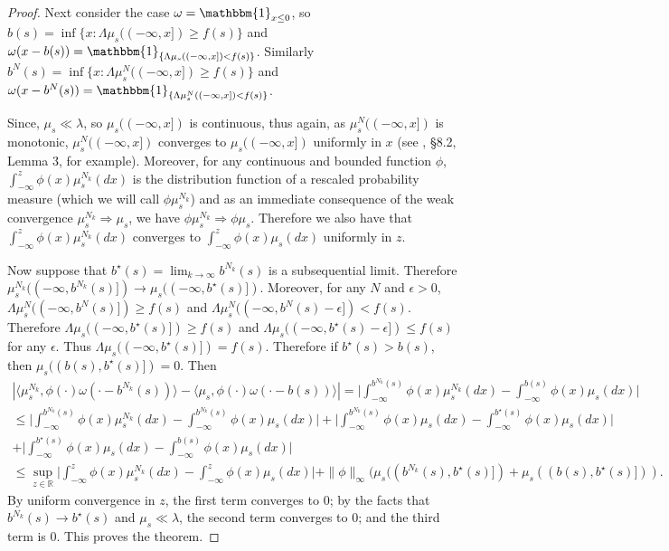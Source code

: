 \documentclass{article}
\newcommand{\B}[1]{\mathbb{#1}}
\newcommand{\is}{\mathbbm{1}}
\begin{document}
\begin{proof}
    Next consider the case $\omega=\is_{x\leq 0}$, so $b(s)=\inf\{x:\Lambda\mu_s((-\infty,x])\geq f(s)\}$ and $\omega(x-b(s))=\is_{\{\Lambda\mu_s((-\infty,x])<f(s)\}}$. Similarly $b^N(s)=\inf\{x:\Lambda\mu_s^N((-\infty,x])\geq f(s)\}$ and $\omega(x-b^N(s))=\is_{\{\Lambda\mu_s^N((-\infty,x])<f(s)\}}$. 
    
    Since, $\mu_s\ll\lambda$, so $\mu_s((-\infty,x])$ is continuous, thus again, as $\mu_s^N((-\infty,x])$ is monotonic, $\mu^N_s((-\infty,x])$ converges to $\mu_s((-\infty,x])$ uniformly in $x$ (see \cite{chowTeicher}, \S 8.2, Lemma 3, for example). Moreover, for any continuous and bounded function $\phi$, $\int_{-\infty}^z \phi(x)\mu_s^{N_k}(dx)$ is the distribution function of a rescaled probability measure (which we will call $\phi\mu_s^{N_k}$) and as an immediate consequence of the weak convergence $\mu_s^{N_k}\Rightarrow \mu_s$, we have $\phi\mu_s^{N_k}\Rightarrow \phi\mu_s$. Therefore we also have that $\int_{-\infty}^z \phi(x)\mu_s^{N_k}(dx)$ converges to $\int_{-\infty}^z \phi(x)\mu_s(dx)$ uniformly in $z$. 
    
    Now suppose that $b^\star(s)=\lim_{k\to\infty}b^{N_k}(s)$ is a subsequential limit. Therefore $\mu^{N_k}_s((-\infty,b^{N_k}(s)])\to\mu_s((-\infty,b^\star(s)])$. Moreover, for any $N$ and $\epsilon>0$, $\Lambda\mu^N_s((-\infty,b^N(s)])\geq f(s)$ and $\Lambda\mu^N_s((-\infty,b^N(s)-\epsilon])<f(s)$. Therefore $\Lambda\mu_s((-\infty,b^\star(s)])\geq f(s)$ and $\Lambda\mu_s((-\infty,b^\star(s)-\epsilon])\leq f(s)$ for any $\epsilon$. Thus $\Lambda\mu_s((-\infty,b^\star(s)])=f(s)$. Therefore if $b^\star(s)>b(s)$, then $\mu_s((b(s),b^\star(s)])=0$. Then
    \begin{align}\nonumber
        |\langle \mu_s^{N_k},\phi(\cdot)\omega(\cdot-b^{N_k}(s))\rangle - \langle \mu_s,\phi(\cdot)\omega(\cdot-b(s))\rangle| = \Big|\int_{-\infty}^{b^{N_k}(s)}\phi(x)\mu^{N_k}_s(dx)-\int_{-\infty}^{b(s)}\phi(x)\mu_s(dx)\Big|\\
        \nonumber\leq \Big|\int_{-\infty}^{b^{N_k}(s)}\phi(x)\mu^{N_k}_s(dx)-\int_{-\infty}^{b^{N_k}(s)}\phi(x)\mu_s(dx)\Big| + \Big|\int_{-\infty}^{b^{N_k}(s)}\phi(x)\mu_s(dx)-\int_{-\infty}^{b^\star(s)}\phi(x)\mu_s(dx)\Big|\\
        +\Big|\int_{-\infty}^{b^\star(s)}\phi(x)\mu_s(dx)-\int_{-\infty}^{b(s)}\phi(x)\mu_s(dx)\Big|\\
        \label{triangleBConv}\leq \sup_{z\in \B{R}}\Big|\int_{-\infty}^z \phi(x)\mu_s^{N_k}(dx)-\int_{-\infty}^z \phi(x)\mu_s(dx)\Big| + \|\phi\|_\infty (\mu_s((b^{N_k}(s),b^\star(s)])+\mu_s((b(s),b^\star(s)])).
    \end{align}
    By uniform convergence in $z$, the first term converges to $0$; by the facts that $b^{N_k}(s)\to b^\star(s)$ and $\mu_s\ll\lambda$, the second term converges to $0$; and the third term is $0$. This proves the theorem. 
\end{proof}
\end{document}
